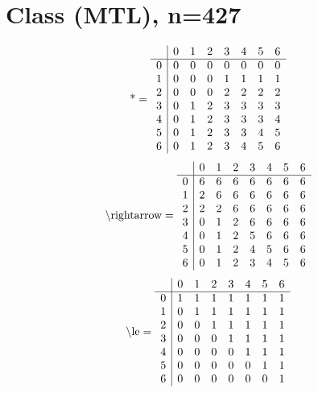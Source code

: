\documentclass[11pt]{article}
\begin{document}
\section{Class (MTL), n=427}
\[\text{*} = 
\begin{array}{r | r r r r r r r}
 & 0 & 1 & 2 & 3 & 4 & 5 & 6 \\ \hline
0 & 0 & 0 & 0 & 0 & 0 & 0 & 0 \\
1 & 0 & 0 & 0 & 1 & 1 & 1 & 1 \\
2 & 0 & 0 & 0 & 2 & 2 & 2 & 2 \\
3 & 0 & 1 & 2 & 3 & 3 & 3 & 3 \\
4 & 0 & 1 & 2 & 3 & 3 & 3 & 4 \\
5 & 0 & 1 & 2 & 3 & 3 & 4 & 5 \\
6 & 0 & 1 & 2 & 3 & 4 & 5 & 6 \\
\end{array}
\]
\[\text{\textbackslash rightarrow} = 
\begin{array}{r | r r r r r r r}
 & 0 & 1 & 2 & 3 & 4 & 5 & 6 \\ \hline
0 & 6 & 6 & 6 & 6 & 6 & 6 & 6 \\
1 & 2 & 6 & 6 & 6 & 6 & 6 & 6 \\
2 & 2 & 2 & 6 & 6 & 6 & 6 & 6 \\
3 & 0 & 1 & 2 & 6 & 6 & 6 & 6 \\
4 & 0 & 1 & 2 & 5 & 6 & 6 & 6 \\
5 & 0 & 1 & 2 & 4 & 5 & 6 & 6 \\
6 & 0 & 1 & 2 & 3 & 4 & 5 & 6 \\
\end{array}
\]
\[\text{\textbackslash le} = 
\begin{array}{r | r r r r r r r}
 & 0 & 1 & 2 & 3 & 4 & 5 & 6 \\ \hline
0 & 1 & 1 & 1 & 1 & 1 & 1 & 1 \\
1 & 0 & 1 & 1 & 1 & 1 & 1 & 1 \\
2 & 0 & 0 & 1 & 1 & 1 & 1 & 1 \\
3 & 0 & 0 & 0 & 1 & 1 & 1 & 1 \\
4 & 0 & 0 & 0 & 0 & 1 & 1 & 1 \\
5 & 0 & 0 & 0 & 0 & 0 & 1 & 1 \\
6 & 0 & 0 & 0 & 0 & 0 & 0 & 1 \\
\end{array}
\]
\end{document}
